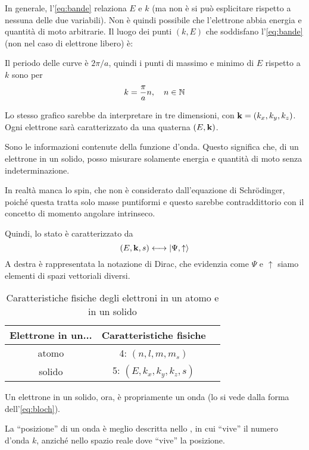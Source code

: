 In generale, l'\cref{eq:bande} relaziona $E$ e $k$ (ma non è si può esplicitare rispetto a nessuna delle due variabili).
Non è quindi possibile che l'elettrone abbia energia e quantità di moto arbitrarie.
Il luogo dei punti $(k, E)$ che soddisfano l'\cref{eq:bande} (non nel caso di elettrone libero) è:


Il periodo delle curve è $2 \pi / a$, quindi i punti di massimo e minimo di $E$ rispetto a $k$ sono per
\begin{equation}
    k = \frac{\pi}{a} n, \quad n \in \mathbb{N}
\end{equation}

Lo stesso grafico sarebbe da interpretare in tre dimensioni, con $\mathbf{k} = (k_x, k_y, k_z)$.
Ogni elettrone sarà caratterizzato da una quaterna $(E, \mathbf{k})$.

Sono le informazioni contenute della funzione d'onda.
Questo significa che, di un elettrone in un solido, posso misurare solamente energia e quantità di moto senza indeterminazione.

In realtà manca lo spin, che non è considerato dall'equazione di Schrödinger, poiché questa tratta solo masse puntiformi e questo sarebbe contraddittorio con il concetto di momento angolare intrinseco.

Quindi, lo stato è caratterizzato da
\begin{equation}
    (E, \mathbf{k}, s) \longleftrightarrow \left\lvert \Psi, \uparrow \right\rangle
\end{equation}
A destra è rappresentata la notazione di Dirac, che evidenzia come $\Psi$ e $\uparrow$ siamo elementi di spazi vettoriali diversi.
\begin{table}[!h]
    \centering
    \begin{tabular}{|c|c|c|}
        \hline
        Elettrone in un... & Caratteristiche fisiche \\
        \hline
        atomo & 4: $(n, l, m, m_s)$ \\
        solido & 5: $(E, k_x, k_y, k_z, s)$ \\
        \hline
    \end{tabular}
    \caption{Caratteristiche fisiche degli elettroni in un atomo e in un solido}
    \label{tab:caratteristiche}
\end{table}

Un elettrone in un solido, ora, è propriamente un onda (lo si vede dalla forma dell'\cref{eq:bloch}).

La ``posizione'' di un onda è meglio descritta nello , in cui ``vive'' il numero d'onda $k$, anziché nello spazio reale dove  ``vive'' la posizione.

